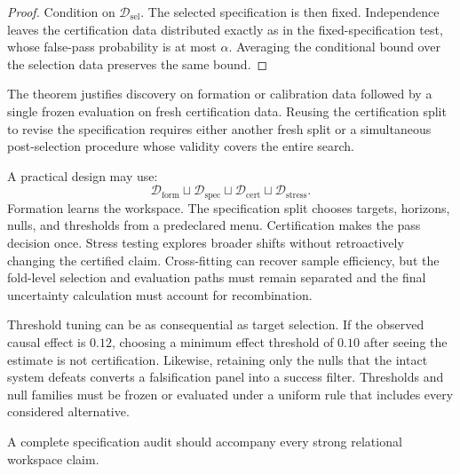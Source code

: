 \begin{proof}
Condition on \(\mathcal D_{\mathrm{sel}}\). The selected specification is then
fixed. Independence leaves the certification data distributed exactly as in
the fixed-specification test, whose false-pass probability is at most
\(\alpha\). Averaging the conditional bound over the selection data preserves
the same bound.
\end{proof}

The theorem justifies discovery on formation or calibration data followed by a
single frozen evaluation on fresh certification data. Reusing the
certification split to revise the specification requires either another fresh
split or a simultaneous post-selection procedure whose validity covers the
entire search.


A practical design may use:
\[
\mathcal D_{\mathrm{form}}
\sqcup
\mathcal D_{\mathrm{spec}}
\sqcup
\mathcal D_{\mathrm{cert}}
\sqcup
\mathcal D_{\mathrm{stress}}.
\]
Formation learns the workspace. The specification split chooses targets,
horizons, nulls, and thresholds from a predeclared menu. Certification makes
the pass decision once. Stress testing explores broader shifts without
retroactively changing the certified claim. Cross-fitting can recover sample
efficiency, but the fold-level selection and evaluation paths must remain
separated and the final uncertainty calculation must account for recombination.


Threshold tuning can be as consequential as target selection. If the observed
causal effect is \(0.12\), choosing a minimum effect threshold of \(0.10\)
after seeing the estimate is not certification. Likewise, retaining only the
nulls that the intact system defeats converts a falsification panel into a
success filter. Thresholds and null families must be frozen or evaluated under
a uniform rule that includes every considered alternative.


A complete specification audit should accompany every strong relational
workspace claim.


